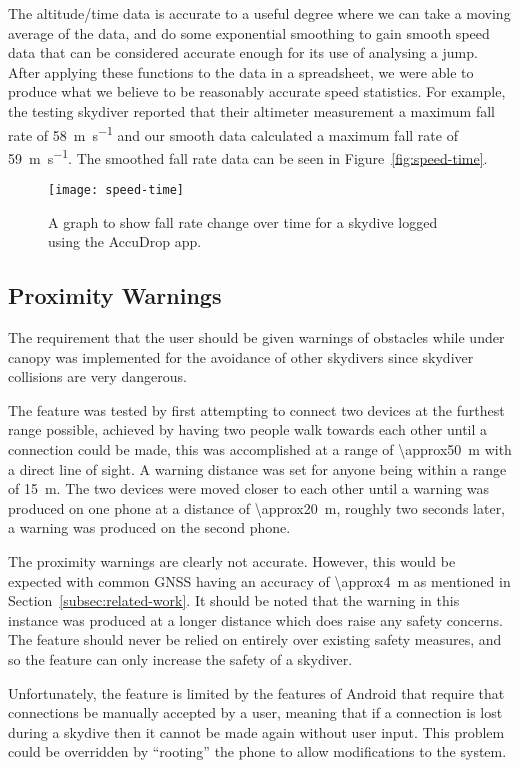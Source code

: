 The altitude/time data is accurate to a useful degree where we can take a moving average of the data, and do some exponential smoothing to gain smooth speed data that can be considered accurate enough for its use of analysing a jump. After applying these functions to the data in a spreadsheet, we were able to produce what we believe to be reasonably accurate speed statistics. For example, the testing skydiver reported that their altimeter measurement a maximum fall rate of \SI{58}{\metre\per\second} and our smooth data calculated a maximum fall rate of \SI{59}{\metre\per\second}. The smoothed fall rate data can be seen in Figure~\vref{fig:speed-time}.

\begin{figure}[ht]
  \centering
  \texttt{[image: speed-time]}
  \caption{A graph to show fall rate change over time for a skydive logged using the AccuDrop app.}\label{fig:speed-time}
\end{figure}

\subsection{Proximity Warnings}
The requirement that the user should be given warnings of obstacles while under canopy was implemented for the avoidance of other skydivers since skydiver collisions are very dangerous.

The feature was tested by first attempting to connect two devices at the furthest range possible, achieved by having two people walk towards each other until a connection could be made, this was accomplished at a range of \SI{\approx50}{\metre} with a direct line of sight. A warning distance was set for anyone being within a range of \SI{15}{\metre}. The two devices were moved closer to each other until a warning was produced on one phone at a distance of \SI{\approx20}{\metre}, roughly two seconds later, a warning was produced on the second phone.

The proximity warnings are clearly not accurate. However, this would be expected with common GNSS having an accuracy of \SI{\approx4}{\metre} as mentioned in Section~\ref{subsec:related-work}. It should be noted that the warning in this instance was produced at a longer distance which does raise any safety concerns. The feature should never be relied on entirely over existing safety measures, and so the feature can only increase the safety of a skydiver.

Unfortunately, the feature is limited by the features of Android that require that connections be manually accepted by a user, meaning that if a connection is lost during a skydive then it cannot be made again without user input. This problem could be overridden by ``rooting'' the phone to allow modifications to the system.

